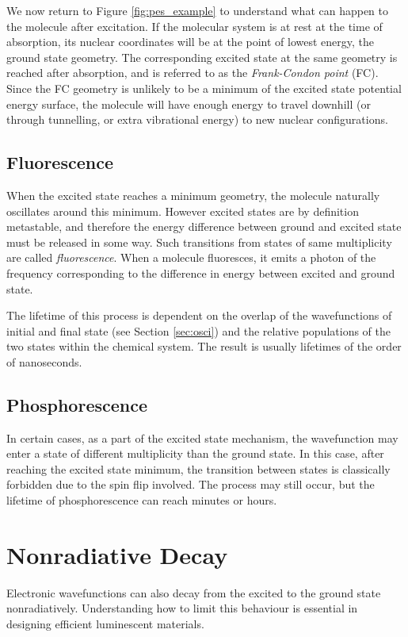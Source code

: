 We now return to Figure \ref{fig:pes_example} to understand what can happen to the molecule after excitation. If the molecular system is at rest at the time of absorption, its nuclear coordinates will be at the point of lowest energy, the ground state geometry. The corresponding excited state at the same geometry is reached after absorption, and is referred to as the \textit{Frank-Condon point} (FC). Since the FC geometry is unlikely to be a minimum of the excited state potential energy surface, the molecule will have enough energy to travel downhill (or through tunnelling, or extra vibrational energy) to new nuclear configurations.

\subsection{Fluorescence}
When the excited state reaches a minimum geometry, the molecule naturally oscillates around this minimum. However excited states are by definition metastable, and therefore the energy difference between ground and excited state must be released in some way. Such transitions from states of same multiplicity are called \textit{fluorescence}. When a molecule fluoresces, it emits a photon of the frequency corresponding to the difference in energy between excited and ground state.

The lifetime of this process is dependent on the overlap of the wavefunctions of initial and final state (see Section \ref{sec:osci}) and the relative populations of the two states within the chemical system. The result is usually lifetimes of the order of nanoseconds.

\subsection{Phosphorescence}
In certain cases, as a part of the excited state mechanism, the wavefunction may enter a state of different multiplicity than the ground state. In this case, after reaching the excited state minimum, the transition between states is classically forbidden due to the spin flip involved. The process may still occur, but the lifetime of phosphorescence can reach minutes or hours.


\section{Nonradiative Decay}
Electronic wavefunctions can also decay from the excited to the ground state nonradiatively. Understanding how to limit this behaviour is essential in designing efficient luminescent materials.

